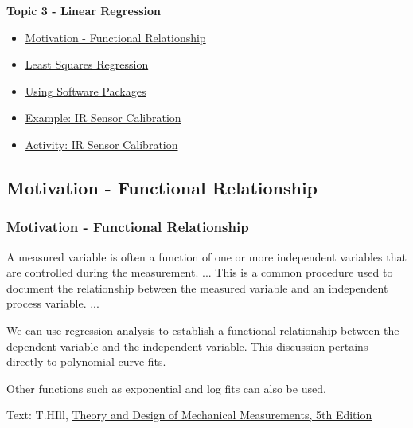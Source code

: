 \documentclass[fleqn]{beamer} %
\newcommand{\sectionIIItitle}{Linear Regression}
\newcommand{\sectionIIIsubsectionItitle}{Motivation - Functional Relationship}
\newcommand{\sectionIIIsubsectionIItitle}{Least Squares Regression}
\newcommand{\sectionIIIsubsectionIIItitle}{Using Software Packages}
\newcommand{\sectionIIIsubsectionIVtitle}{Example: IR Sensor Calibration}
\newcommand{\sectionIIIsubsectionVtitle}{Activity: IR Sensor Calibration}
\begin{document}
		\begin{frame}
			\large \textbf{Topic 3 - \sectionIIItitle} \vspace{3mm}\\

			\begin{itemize}
				\item \hyperlink{sectionIIIsubsectionI}{\sectionIIIsubsectionItitle} \vspc %
				\item \hyperlink{sectionIIIsubsectionII}{\sectionIIIsubsectionIItitle} \vspc %
				\item \hyperlink{sectionIIIsubsectionIII}{\sectionIIIsubsectionIIItitle} \vspc %
				\item \hyperlink{sectionIIIsubsectionIV}{\sectionIIIsubsectionIVtitle} \vspc %
				\item \hyperlink{sectionIIIsubsectionV}{\sectionIIIsubsectionVtitle} \vspc %
			\end{itemize}

		\end{frame}

		\subsection{\sectionIIIsubsectionItitle}\label{sectionIIIsubsectionI}

			\begin{frame}
				\frametitle{\sectionIIIsubsectionItitle}


A measured variable is often a function of one or more independent variables that are controlled during the measurement. ... This is a common procedure used to document the relationship between the measured variable and an independent process variable. ... \vspccc

We can use {\GR regression} analysis to establish a {\BL functional relationship} between the {\PN dependent} variable and the {\PR independent} variable. This discussion pertains directly to polynomial curve fits.\vspcc

Other functions such as exponential and log fits can also be used.

\vspace{10mm}
{\tiny Text: T.HIll, \underline{Theory and Design of Mechanical Measurements, 5th Edition} }

				
			\end{frame}
\end{document}
